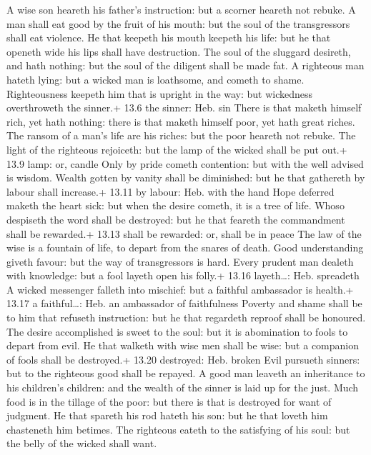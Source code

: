  A wise son heareth his father's instruction: but a scorner
heareth not rebuke.  A man shall eat good by the fruit of
his mouth: but the soul of the transgressors shall eat violence.
 He that keepeth his mouth keepeth his life: but he that
openeth wide his lips shall have destruction.  The soul of
the sluggard desireth, and hath nothing: but the soul of the diligent
shall be made fat.  A righteous man hateth lying: but a
wicked man is loathsome, and cometh to shame.  Righteousness
keepeth him that is upright in the way: but wickedness overthroweth the
sinner.+ 13.6 the sinner: Heb. sin  There is that maketh
himself rich, yet hath nothing: there is that maketh himself poor, yet
hath great riches.  The ransom of a man's life are his
riches: but the poor heareth not rebuke.  The light of the
righteous rejoiceth: but the lamp of the wicked shall be put out.+ 13.9
lamp: or, candle  Only by pride cometh contention: but with
the well advised is wisdom.  Wealth gotten by vanity shall
be diminished: but he that gathereth by labour shall increase.+ 13.11 by
labour: Heb. with the hand  Hope deferred maketh the heart
sick: but when the desire cometh, it is a tree of life. 
Whoso despiseth the word shall be destroyed: but he that feareth the
commandment shall be rewarded.+ 13.13 shall be rewarded: or, shall be in
peace  The law of the wise is a fountain of life, to depart
from the snares of death.  Good understanding giveth
favour: but the way of transgressors is hard.  Every
prudent man dealeth with knowledge: but a fool layeth open his folly.+
13.16 layeth\ldots: Heb. spreadeth  A wicked messenger
falleth into mischief: but a faithful ambassador is health.+ 13.17 a
faithful\ldots: Heb. an ambassador of faithfulness  Poverty
and shame shall be to him that refuseth instruction: but he that
regardeth reproof shall be honoured.  The desire
accomplished is sweet to the soul: but it is abomination to fools to
depart from evil.  He that walketh with wise men shall be
wise: but a companion of fools shall be destroyed.+ 13.20 destroyed:
Heb. broken  Evil pursueth sinners: but to the righteous
good shall be repayed.  A good man leaveth an inheritance
to his children's children: and the wealth of the sinner is laid up for
the just.  Much food is in the tillage of the poor: but
there is that is destroyed for want of judgment.  He that
spareth his rod hateth his son: but he that loveth him chasteneth him
betimes.  The righteous eateth to the satisfying of his
soul: but the belly of the wicked shall want.

